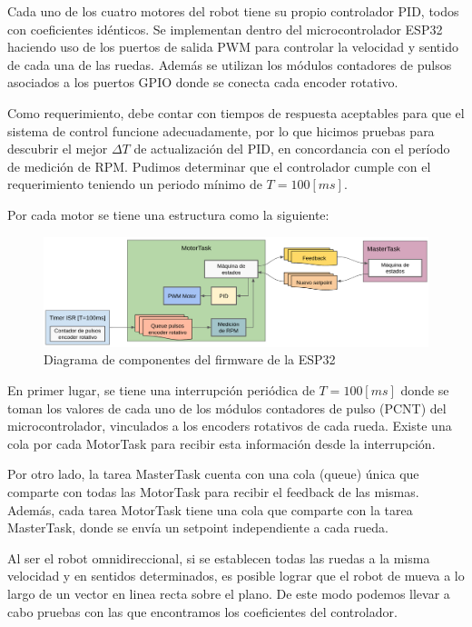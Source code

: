 Cada uno de los cuatro motores del robot tiene su propio controlador PID, todos con coeficientes idénticos. Se implementan dentro del microcontrolador ESP32 haciendo uso de los puertos de salida PWM para controlar la velocidad y sentido de cada una de las ruedas. Además se utilizan los módulos contadores de pulsos asociados a los puertos GPIO donde se conecta cada encoder rotativo.

Como requerimiento, debe contar con tiempos de respuesta aceptables para que el sistema de control funcione adecuadamente, por lo que hicimos pruebas para descubrir el mejor $\Delta T$ de actualización del PID, en concordancia con el período de medición de RPM. Pudimos determinar que el controlador cumple con el requerimiento teniendo un periodo mínimo de $T=100[ms]$.

Por cada motor se tiene una estructura como la siguiente:

\begin{figure}[H]
    \centering
    \hspace*{-0.75cm}
    \includegraphics[width=1.1\linewidth]{images/diag_comp_esp32_pid_solo.png}
    \caption{Diagrama de componentes del firmware de la ESP32}
    \label{fig:diagcomponentesp32}
\end{figure}

En primer lugar, se tiene una interrupción periódica de $T=100[ms]$ donde se toman los valores de cada uno de los módulos contadores de pulso (PCNT) del microcontrolador, vinculados a los encoders rotativos de cada rueda. Existe una cola por cada MotorTask para recibir esta información desde la interrupción.

Por otro lado, la tarea MasterTask cuenta con una cola (queue) única que comparte con todas las MotorTask para recibir el feedback de las mismas. Además, cada tarea MotorTask tiene una cola que comparte con la tarea MasterTask, donde se envía un setpoint independiente a cada rueda.

Al ser el robot omnidireccional, si se establecen todas las ruedas a la misma velocidad y en sentidos determinados, es posible lograr que el robot de mueva a lo largo de un vector en linea recta sobre el plano. De este modo podemos llevar a cabo pruebas con las que encontramos los coeficientes del controlador.

